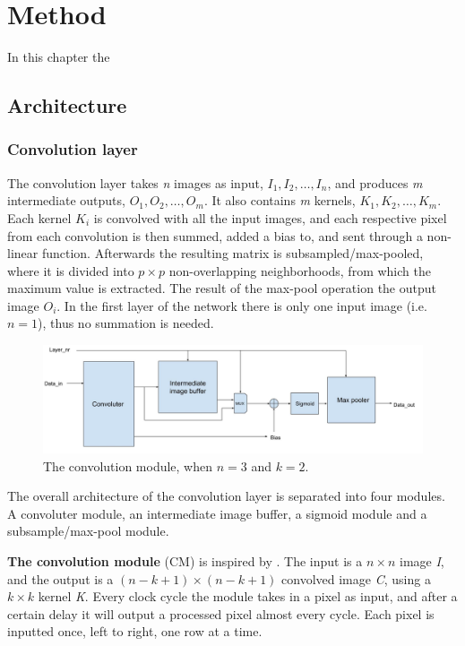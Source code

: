 \chapter{Method}

In this chapter the 
\section{Architecture}




\subsection {Convolution layer}

The convolution layer takes \textit{n} images as input, $ I_1, I_2, \dots, I_n $, and produces \textit{m} intermediate outputs, $O_1, O_2, \dots, O_m $. It also contains \textit{m} kernels, $ K_1, K_2, \dots, K_m $. Each kernel $ K_i $ is convolved with all the input images, and each respective pixel from each convolution is then summed, added a bias to, and sent through a non-linear function. Afterwards the resulting matrix is subsampled/max-pooled, where it is divided into $ p \times p $ non-overlapping neighborhoods, from which the maximum value is extracted. The result of the max-pool operation the output image $ O_i $. 
In the first layer of the network there is only one input image (i.e. $ n = 1 $), thus no summation is needed. 

\begin{figure}[h!]
  \centering
      \includegraphics[width=1.0\textwidth]{Figures/Method/conv_layer_arch}
  \caption{The convolution module, when $ n = 3 $ and $ k = 2 $.}
\end{figure}

The overall architecture of the convolution layer is separated into four modules. A convoluter module, an intermediate image buffer, a sigmoid module and a subsample/max-pool module.

\vspace*{1\baselineskip}
\textbf{The convolution module} (CM) is inspired by \cite{Farabet2009}. The input is a $ n \times n $ image \textit{I}, and the output is a $ (n-k+1) \times (n-k+1) $ convolved image \textit{C}, using a $ k \times k $ kernel \textit{K}. Every clock cycle the module takes in a pixel as input, and after a certain delay it will output a processed pixel almost every cycle. Each pixel is inputted once, left to right, one row at a time. 


